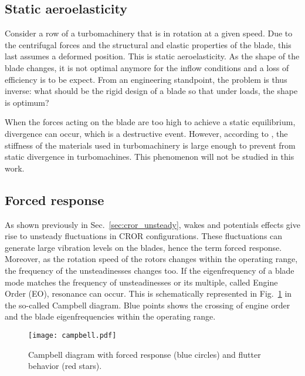 
\subsection{Static aeroelasticity}
\label{sub:static_aeroelasticity}

Consider a row of a turbomachinery that is in
rotation at a given speed. Due to the centrifugal forces
and the structural and elastic properties of the blade, this
last assumes a deformed position. This is static aeroelasticity.
As the shape of the blade changes, it is not
optimal anymore for the inflow conditions 
and a loss of efficiency is to be expect.
From an engineering standpoint, the problem is thus inverse:
what should be the rigid design of a blade so that under 
loads, the shape is optimum?

When the forces acting on the blade
are too high to achieve a static equilibrium, divergence can occur,
which is a destructive event.
However, according to \citet{Marshall1996}, the stiffness of the
materials used in turbomachinery is large enough to
prevent from static divergence in turbomachines.
This phenomenon will not be studied in this work.

\subsection{Forced response}
\label{sub:forced_response}

As shown previously in Sec.~\ref{sec:cror_unsteady}, wakes and
potentials effects give rise to unsteady fluctuations in 
CROR configurations. These fluctuations 
can generate large vibration levels on the blades,
hence the term forced response. Moreover, as the rotation speed of the
rotors changes within the operating range, the frequency of
the unsteadinesses changes too. If the eigenfrequency
of a blade mode matches the frequency of unsteadinesses or its multiple, 
called Engine Order (EO), resonance can occur. 
This is schematically represented in Fig.~\ref{fig:campbell}
in the so-called Campbell diagram.
Blue points shows the crossing of engine order and 
the blade eigenfrequencies
within the operating range. 
\begin{figure}[htbp]
  \centering
  \texttt{[image: campbell.pdf]}
  \caption{Campbell diagram with forced response (blue circles)
  and flutter behavior (red stars).}
  \label{fig:campbell}
\end{figure}

